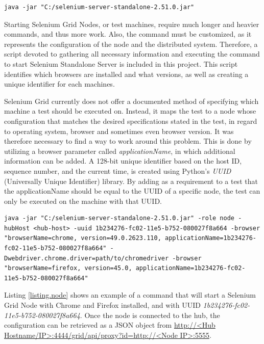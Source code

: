 \vspace{4mm}
\begin{lstlisting}[caption=Sample Shell Command for Starting Selenium Grid Hub, label={listing.hub}]
java -jar "C:/selenium-server-standalone-2.51.0.jar"
\end{lstlisting}

Starting Selenium Grid Nodes, or test machines, require much longer and heavier commands, and thus more work. Also, the command must be customized, as it represents the configuration of the node and the distributed system. Therefore, a script devoted to gathering all necessary information and executing the command to start Selenium Standalone Server is included in this project. This script identifies which browsers are installed and what versions, as well as creating a unique identifier for each machines.

Selenium Grid currently does not offer a documented method of specifying which machine a test should be executed on. Instead, it maps the test to a node whose configuration that matches the desired specifications stated in the test, in regard to operating system, browser and sometimes even browser version. It was therefore necessary to find a way to work around this problem. This is done by utilizing a browser parameter called \emph{applicationName}, in which additional information can be added. A 128-bit unique identifier based on the host ID, sequence number, and the current time, is created using Python's \emph{UUID} (Universally Unique Identifier) library. By adding as a requirement to a test that the applicationName should be equal to the UUID of a specific node, the test can only be executed on the machine with that UUID.

\vspace{4mm}
\begin{lstlisting}[caption=Sample Shell Command for Starting Selenium Grid Node, label={listing.node}]
java -jar "C:/selenium-server-standalone-2.51.0.jar" -role node -hubHost <hub-host> -uuid 1b234276-fc02-11e5-b752-080027f8a664 -browser "browserName=chrome, version=49.0.2623.110, applicationName=1b234276-fc02-11e5-b752-080027f8a664" -Dwebdriver.chrome.driver=path/to/chromedriver -browser "browserName=firefox, version=45.0, applicationName=1b234276-fc02-11e5-b752-080027f8a664"
\end{lstlisting}

Listing \ref{listing.node} shows an example of a command that will start a Selenium Grid Node with Chrome and Firefox installed, and with UUID \emph{1b234276-fc02-11e5-b752-080027f8a664}. Once the node is connected to the hub, the configuration can be retrieved as a JSON object from \url{http://<Hub Hostname/IP>:4444/grid/api/proxy?id=http://<Node IP>:5555}.

